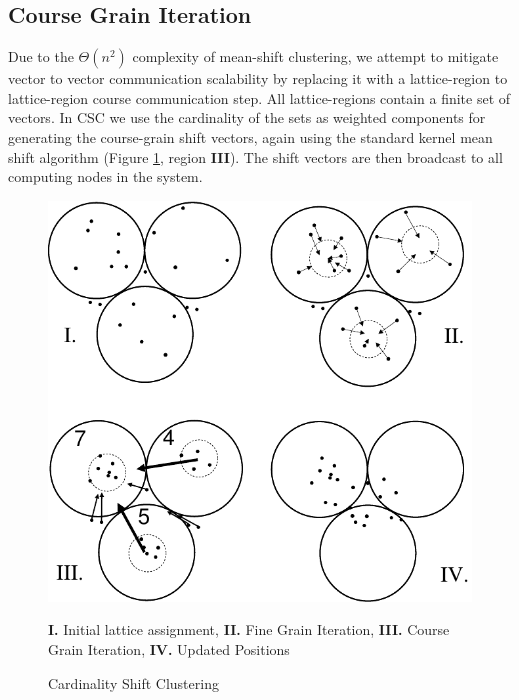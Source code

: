 \subsection{Course Grain Iteration}

Due to the $\Theta(n^2)$ complexity of mean-shift clustering, we attempt to mitigate vector to vector communication
scalability by replacing it with a lattice-region to lattice-region course communication step.  All lattice-regions
contain a finite set of vectors.  In CSC we use the cardinality of the sets as weighted components for generating the
course-grain shift vectors, again using the standard kernel mean shift algorithm (Figure \ref{csc}, region
\textbf{III}).  The shift vectors are then broadcast to all computing nodes in the system.

\begin{figure}
    \centerline{\includegraphics[width=.8\textwidth]{figs/csc}}
\caption{Cardinality Shift Clustering}{\textbf{I.} Initial lattice assignment, \textbf{II.} Fine Grain Iteration,
  \textbf{III.} Course Grain Iteration, \textbf{IV.} Updated Positions}\label{csc}
\end{figure}

